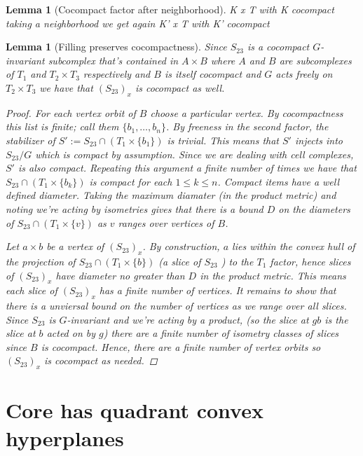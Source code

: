 \documentclass{article}
\theoremstyle{mystyle}
\newtheorem{lem}[thm]{Lemma}
\theoremstyle{remark}
\begin{document}
\begin{lem}
    [Cocompact factor after neighborhood]
    \label{lem:cocompactfactor} 
    K x T with K cocompact taking a neighborhood we get again K' x T with K' cocompact
\end{lem}
\begin{lem} 
[Filling preserves cocompactness]
\label{lem:fillingcocompact}
    Since $S_{23}$ is a cocompact $G$-invariant subcomplex that's contained in \(A \times B\) where \(A\) and \(B\) are subcomplexes of \(T_1\) and \(T_2 \times T_3\) respectively and \(B\) is itself cocompact and $G$ acts freely on $T_2\times T_3$ we have that $(S_{23})_x$ is cocompact as well. 
\begin{proof}
     For each vertex orbit of $B$ choose a particular vertex. By cocompactness this list is finite; call them $\{b_1,\ldots,b_n\}$. By freeness in the second factor, the stabilizer of $S' := S_{23} \cap (T_1 \times \{b_1\})$ is trivial. This means that $S'$ injects into $S_{23}/G$ which is compact by assumption. Since we are dealing with cell complexes, $S'$ is also compact. Repeating this argument a finite number of times we have that $S_{23}\cap (T_1\times \{b_k\})$ is compact for each \(1 \leq k \leq n \). Compact items have a well defined diameter. Taking the maximum diamater (in the product metric) and noting we're acting by isometries gives that there is a bound \(D\) on the diameters of \(S_{23} \cap (T_1\times \{v\})\) as \(v\) ranges over vertices of \(B\). 



    Let \(a \times b\) be a vertex of \((S_{23})_x\). By construction, \(a\) lies within the convex hull of the projection of \(S_{23} \cap (T_1\times \{b\})\) (a slice of \(S_{23}\) ) to the \(T_1\) factor, hence slices of \((S_{ 23 })_x\) have diameter no greater than \(D\) in the product metric. 
    This means each slice of \((S_{23})_x\) has a finite number of vertices. It remains to show that there is a unviersal bound on the number of vertices as we range over all slices. Since \(S_{23}\) is $G$-invariant and we're acting by a product, (so the slice at \(gb\) is the slice at \(b\) acted on by \(g\)) there are a finite number of isometry classes of slices since \(B\) is cocompact. Hence, there are a finite number of vertex orbits so \((S_{23})_x\) is cocompact as needed.
\end{proof}
\end{lem}


\section{Core has quadrant convex hyperplanes}
\end{document}
